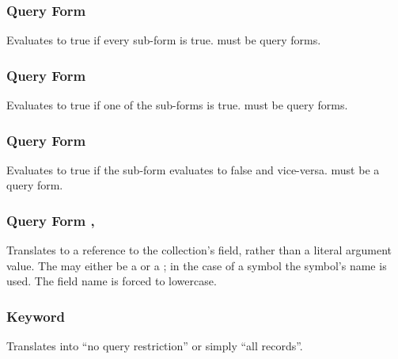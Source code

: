 \subsubsection{Query Form }
Evaluates to true if every sub-form is true.
 must be query forms.
\subsubsection{Query Form }
Evaluates to true if one of the sub-forms is true.
 must be query forms.
\subsubsection{Query Form }
Evaluates to true if the sub-form evaluates to false and vice-versa.
 must be a query form.
\subsubsection{Query Form , }
Translates to a reference to the collection's field, rather than a literal argument value. The  may either be a  or a ; in the case of a symbol the symbol's name is used. The field name is forced to lowercase.
\subsubsection{Keyword }
Translates into ``no query restriction'' or simply ``all records''.
